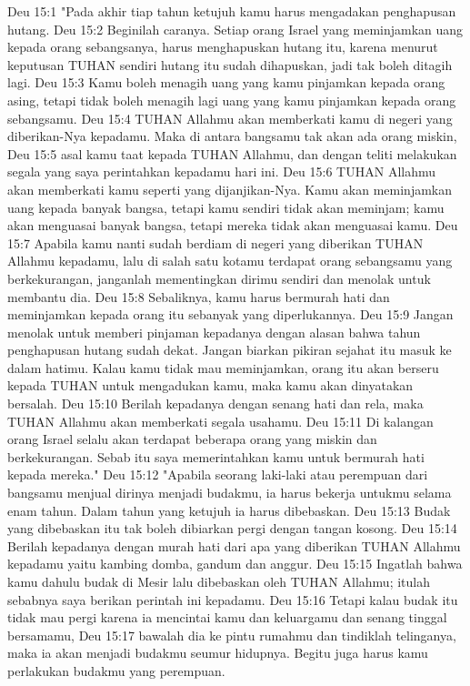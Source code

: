 Deu 15:1  "Pada akhir tiap tahun ketujuh kamu harus mengadakan penghapusan hutang.
Deu 15:2  Beginilah caranya. Setiap orang Israel yang meminjamkan uang kepada orang sebangsanya, harus menghapuskan hutang itu, karena menurut keputusan TUHAN sendiri hutang itu sudah dihapuskan, jadi tak boleh ditagih lagi.
Deu 15:3  Kamu boleh menagih uang yang kamu pinjamkan kepada orang asing, tetapi tidak boleh menagih lagi uang yang kamu pinjamkan kepada orang sebangsamu.
Deu 15:4  TUHAN Allahmu akan memberkati kamu di negeri yang diberikan-Nya kepadamu. Maka di antara bangsamu tak akan ada orang miskin,
Deu 15:5  asal kamu taat kepada TUHAN Allahmu, dan dengan teliti melakukan segala yang saya perintahkan kepadamu hari ini.
Deu 15:6  TUHAN Allahmu akan memberkati kamu seperti yang dijanjikan-Nya. Kamu akan meminjamkan uang kepada banyak bangsa, tetapi kamu sendiri tidak akan meminjam; kamu akan menguasai banyak bangsa, tetapi mereka tidak akan menguasai kamu.
Deu 15:7  Apabila kamu nanti sudah berdiam di negeri yang diberikan TUHAN Allahmu kepadamu, lalu di salah satu kotamu terdapat orang sebangsamu yang berkekurangan, janganlah mementingkan dirimu sendiri dan menolak untuk membantu dia.
Deu 15:8  Sebaliknya, kamu harus bermurah hati dan meminjamkan kepada orang itu sebanyak yang diperlukannya.
Deu 15:9  Jangan menolak untuk memberi pinjaman kepadanya dengan alasan bahwa tahun penghapusan hutang sudah dekat. Jangan biarkan pikiran sejahat itu masuk ke dalam hatimu. Kalau kamu tidak mau meminjamkan, orang itu akan berseru kepada TUHAN untuk mengadukan kamu, maka kamu akan dinyatakan bersalah.
Deu 15:10  Berilah kepadanya dengan senang hati dan rela, maka TUHAN Allahmu akan memberkati segala usahamu.
Deu 15:11  Di kalangan orang Israel selalu akan terdapat beberapa orang yang miskin dan berkekurangan. Sebab itu saya memerintahkan kamu untuk bermurah hati kepada mereka."
Deu 15:12  "Apabila seorang laki-laki atau perempuan dari bangsamu menjual dirinya menjadi budakmu, ia harus bekerja untukmu selama enam tahun. Dalam tahun yang ketujuh ia harus dibebaskan.
Deu 15:13  Budak yang dibebaskan itu tak boleh dibiarkan pergi dengan tangan kosong.
Deu 15:14  Berilah kepadanya dengan murah hati dari apa yang diberikan TUHAN Allahmu kepadamu yaitu kambing domba, gandum dan anggur.
Deu 15:15  Ingatlah bahwa kamu dahulu budak di Mesir lalu dibebaskan oleh TUHAN Allahmu; itulah sebabnya saya berikan perintah ini kepadamu.
Deu 15:16  Tetapi kalau budak itu tidak mau pergi karena ia mencintai kamu dan keluargamu dan senang tinggal bersamamu,
Deu 15:17  bawalah dia ke pintu rumahmu dan tindiklah telinganya, maka ia akan menjadi budakmu seumur hidupnya. Begitu juga harus kamu perlakukan budakmu yang perempuan.
